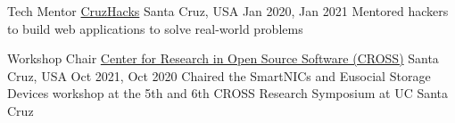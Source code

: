 

\begin{cventries}

  \cventry
    {Tech Mentor} %
    {\href{https://www.cruzhacks.com/}{CruzHacks}} %
    {Santa Cruz, USA} %
    {Jan 2020, Jan 2021} %
    {Mentored hackers to build web applications to solve real-world problems}

  \cventry
    {Workshop Chair} %
    {\href{https://cross.ucsc.edu/}{Center for Research in Open Source Software (CROSS)}} %
    {Santa Cruz, USA} %
    {Oct 2021, Oct 2020} %
    {Chaired the SmartNICs and Eusocial Storage Devices workshop at the 5th and 6th CROSS Research Symposium at UC Santa Cruz}

\end{cventries}

